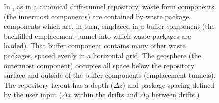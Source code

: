 
\begin{figure}[htbp!]
\begin{center}
\def\svgwidth{.5\textwidth}

\end{center}
\caption{In \Cyder, as in a canonical drift-tunnel repository, waste form 
        components (the innermost components) are contained by waste package components which 
        are, in turn, emplaced in a buffer component (the backfilled 
        emplacement tunnel into which waste packages are loaded). That buffer component 
        contains many other waste packages, spaced evenly in a horizontal grid. 
        The geosphere (the outermost component) occupies all space below the 
        repository surface and outside of the buffer components (emplacement 
        tunnels). The \Cyder repository layout has a depth ($\Delta z$) and 
        package spacing defined by the user input ($\Delta x$ within the drifts 
        and $\Delta y$ between drifts.)}
\label{fig:repo_layout}
\end{figure}
